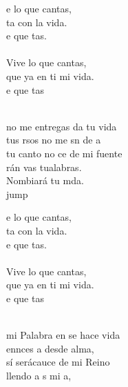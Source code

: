 \begin{cancion}%
	\begin{chorus}%
	e lo que cantas, \\
	ta con la vida.\\
	e que tas.\\
	\jump\\
Vive lo que cantas,\\
	que ya en ti mi vida.\\
	e que tas    \\
	\end{chorus}%
	\jump\\
	no me entregas da tu vida\\
	tus rsos no me sn de a\\
	tu canto no ce de mi fuente\\
	rán vas tualabras.\\
	Nombiará tu mda.\\jump\\
	\begin{chorus}%
	e lo que cantas, \\
	ta con la vida.\\
	e que tas.\\
	\jump\\
Vive lo que cantas,\\
	que ya en ti mi vida.\\
	e que tas    \\
	\end{chorus}%
	\jump\\
	mi Palabra en  se hace vida\\
	ennces a desde alma,\\
	sí serácauce de mi Reino\\
	llendo a s mi a,\\

\end{cancion}
